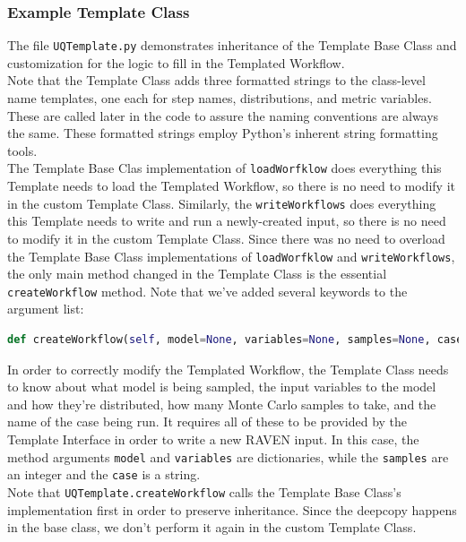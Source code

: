\subsubsection{Example Template Class}
The file \texttt{UQTemplate.py} demonstrates inheritance of the Template Base Class and customization for the logic to fill in the Templated Workflow.
\\

Note that the Template Class adds three formatted strings to the class-level name templates, one each for step names, distributions, and metric variables. These are called later in the code to assure the naming conventions are always the same. These formatted strings employ Python's inherent string formatting tools.
\\

The Template Base Clas implementation of \texttt{loadWorfklow} does everything this Template needs to load the Templated Workflow, so there is no need to modify it in the custom Template Class. Similarly, the \texttt{writeWorkflows} does everything this Template needs to write and run a newly-created input, so there is no need to modify it in the custom Template Class.  Since there was no need to overload the Template Base Class implementations of \texttt{loadWorfklow} and \texttt{writeWorkflows}, the only main method changed in the Template Class is the essential \texttt{createWorkflow} method. Note that we've added several keywords to the argument list:
\begin{lstlisting}[language=python]
  def createWorkflow(self, model=None, variables=None, samples=None, case=None, **kwargs):
\end{lstlisting}
In order to correctly modify the Templated Workflow, the Template Class needs to know about what model is being sampled, the input variables to the model and how they're distributed, how many Monte Carlo samples to take, and the name of the case being run. It requires all of these to be provided by the Template Interface in order to write a new RAVEN input. In this case, the method arguments \texttt{model} and \texttt{variables} are dictionaries, while the \texttt{samples} are an integer and the \texttt{case} is a string.
\\

Note that \texttt{UQTemplate.createWorkflow} calls the Template Base Class's implementation first in order to preserve inheritance. Since the deepcopy happens in the base class, we don't perform it again in the custom Template Class.
\\

